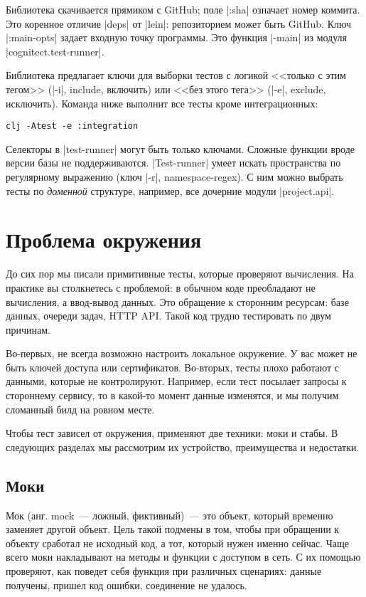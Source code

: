 Библиотека скачивается прямиком с GitHub; поле \spverb|:sha| означает номер
коммита. Это коренное отличие \spverb|deps| от \spverb|lein|: репозиторием может
быть GitHub. Ключ \spverb|:main-opts| задает входную точку программы. Это
функция \spverb|-main| из модуля \spverb|cognitect.test-runner|.

Библиотека предлагает ключи для выборки тестов с логикой <<только с этим тегом>>
(\spverb|-i|, include, включить) или <<без этого тега>> (\spverb|-e|, exclude,
исключить). Команда ниже выполнит все тесты кроме интеграционных:

\begin{verbatim}
clj -Atest -e :integration
\end{verbatim}

Селекторы в \spverb|test-runner| могут быть только ключами. Сложные функции
вроде версии базы не поддерживаются. \spverb|Test-runner| умеет искать
пространства по регулярному выражению (ключ \spverb|-r|, namespace-regex). С ним
можно выбрать тесты по \emph{доменной} структуре, например, все дочерние модули
\spverb|project.api|.


\section{Проблема окружения}

До сих пор мы писали примитивные тесты, которые проверяют вычисления. На
практике вы столкнетесь с проблемой: в обычном коде преобладают не вычисления, а
ввод-вывод данных. Это обращение к сторонним ресурсам: базе данных, очереди
задач, HTTP API. Такой код трудно тестировать по двум причинам.

Во-первых, не всегда возможно настроить локальное окружение. У вас может не быть
ключей доступа или сертификатов. Во-вторых, тесты плохо работают с данными,
которые не контролируют. Например, если тест посылает запросы к стороннему
сервису, то в какой-то момент данные изменятся, и мы получим сломанный билд на
ровном месте.

Чтобы тест зависел от окружения, применяют две техники: моки и стабы. В
следующих разделах мы рассмотрим их устройство, преимущества и недостатки.

\subsection{Моки}

Мок (анг. mock~--- ложный, фиктивный)~--- это объект, который временно заменяет
другой объект. Цель такой подмены в том, чтобы при обращении к объекту сработал
не исходный код, а тот, который нужен именно сейчас. Чаще всего моки накладывают
на методы и функции с доступом в сеть. С их помощью проверяют, как поведет себя
функция при различных сценариях: данные получены, пришел код ошибки, соединение
не удалось.

